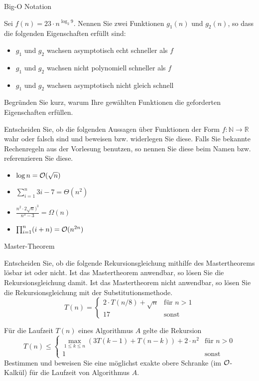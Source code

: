\documentclass{exercisesheet}
\begin{document}
\begin{exercises}{Big-O Notation}
\item Sei $f(n) = 23 \cdot n^{\log_2{9}}$. Nennen Sie zwei Funktionen $g_1(n)$ und $g_2(n)$, so dass die folgenden Eigenschaften erfüllt sind:
\begin{itemize}
  \item $g_1$ und $g_2$ wachsen asymptotisch echt schneller als $f$
  \item $g_1$ und $g_2$ wachsen nicht polynomiell schneller als $f$
  \item $g_1$ und $g_2$ wachsen asymptotisch nicht gleich schnell
\end{itemize}
Begründen Sie kurz, warum Ihre gewählten Funktionen die geforderten Eigenschaften erfüllen.
\item Entscheiden Sie, ob die folgenden Aussagen über Funktionen der Form $f: \mathbb{N} \to \mathbb{R}$ wahr oder falsch sind und beweisen bzw. widerlegen Sie diese. Falls Sie bekannte Rechenregeln aus der Vorlesung benutzen, so nennen Sie diese beim Namen bzw. referenzieren Sie diese.
\begin{itemize}
  \item $\log n = \mathcal{O}(\sqrt{n})$
  \item $\sum_{i=1}^n 3i - 7 = \Theta(n^2)$
  \item $\frac{n^2\cdot 2\sqrt{n})^3}{n^3-3} = \Omega(n) $
  \item $\prod_{i=1}^n (i + n) = \mathcal{O}(n^{2n})$
\end{itemize}
\end{exercises}

\begin{exercises}{Master-Theorem}
\item Entscheiden Sie, ob die folgende Rekursionsgleichung mithilfe des Mastertheorems lösbar ist oder nicht. Ist das Mastertheorem anwendbar, so lösen Sie die Rekursionsgleichung damit. Ist das Mastertheorem nicht anwendbar, so lösen Sie die Rekursionsgleichung mit der Substitutionsmethode.
\begin{equation*}
  T(n) = \begin{cases}
    2\cdot T(n/8)+\sqrt{n} & \text{für } n > 1 \\
    17                     & \text{sonst}
  \end{cases}
\end{equation*}
\item Für die Laufzeit $T(n)$ eines Algorithmus $A$ gelte die Rekursion
\begin{equation*}
  T(n) \leq \begin{cases}
    \max_{1\leq k\leq n}(3T(k-1)+T(n-k))+2\cdot n^2 & \text{für } n > 0 \\
    1                                               & \text{sonst}
  \end{cases}
\end{equation*}
Bestimmen und beweisen Sie eine möglichst exakte obere Schranke (im $\mathcal{O}$-Kalkül) für die Laufzeit von Algorithmus $A$.
\end{exercises}
\end{document}
